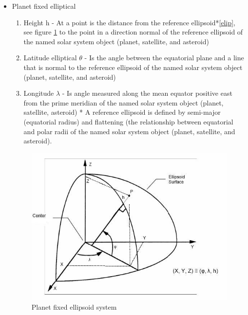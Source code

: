 \documentclass[twoside,11pt,titlepage]{report}
\begin{document}
\begin{itemize}
\label{reqt:pfixellip}\ \newline
\item Planet fixed elliptical
\begin{enumerate}
\item Height {h} - At a point is the distance from the reference ellipsoid*\ref{elip}, see figure \ref{fig:2} to the point in a direction normal of the reference ellipsoid of the named solar system object (planet, satellite, and asteroid)
\item Latitude elliptical {$\theta$} - Is the angle between the equatorial plane and a line that is normal to the reference ellipsoid of the named solar system object (planet, satellite, and asteroid)
\item Longitude {$\lambda$} - Is angle measured along the mean equator positive east from the prime meridian of the named solar system object (planet, satellite, asteroid)
*\label{elip} A reference ellipsoid is defined by semi-major (equatorial radius) and flattening (the relationship between equatorial and polar radii of the named solar system object (planet, satellite, and asteroid).
\end{enumerate}

\begin{figure}[htp]
\centering
\includegraphics [width=5in]{figs/ellipse.jpg}
\caption{Planet fixed ellipsoid system}
\label{fig:2}
\end{figure}

\newpage


\end{itemize}
\end{document}
